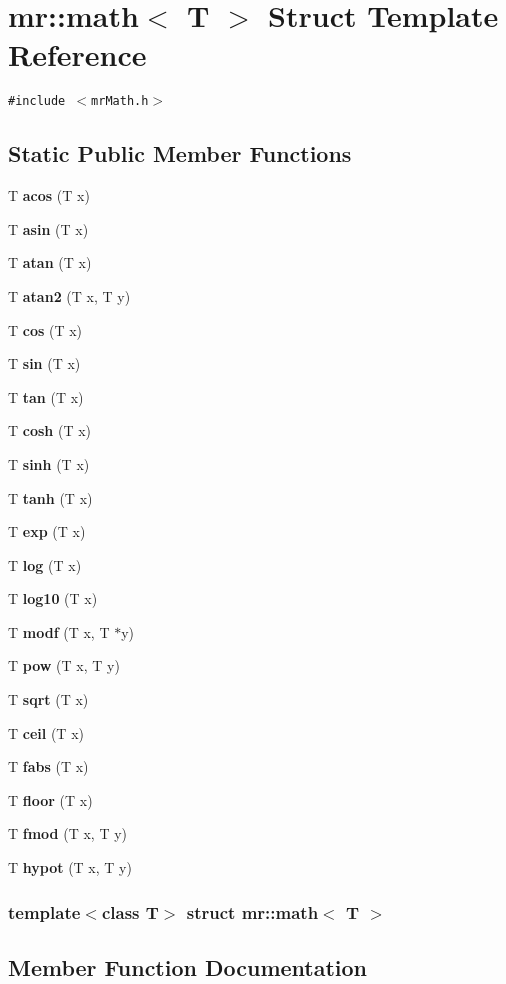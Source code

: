 \section{mr::math$<$ T $>$ Struct Template Reference}
\label{structmr_1_1math}
{\tt \#include $<$mr\-Math.h$>$}

\subsection*{Static Public Member Functions}
\begin{CompactItemize}
\item 
T {\bf acos} (T x)
\item 
T {\bf asin} (T x)
\item 
T {\bf atan} (T x)
\item 
T {\bf atan2} (T x, T y)
\item 
T {\bf cos} (T x)
\item 
T {\bf sin} (T x)
\item 
T {\bf tan} (T x)
\item 
T {\bf cosh} (T x)
\item 
T {\bf sinh} (T x)
\item 
T {\bf tanh} (T x)
\item 
T {\bf exp} (T x)
\item 
T {\bf log} (T x)
\item 
T {\bf log10} (T x)
\item 
T {\bf modf} (T x, T $\ast$y)
\item 
T {\bf pow} (T x, T y)
\item 
T {\bf sqrt} (T x)
\item 
T {\bf ceil} (T x)
\item 
T {\bf fabs} (T x)
\item 
T {\bf floor} (T x)
\item 
T {\bf fmod} (T x, T y)
\item 
T {\bf hypot} (T x, T y)
\end{CompactItemize}
\subsubsection*{template$<$class T$>$ struct mr::math$<$ T $>$}



\subsection{Member Function Documentation}
